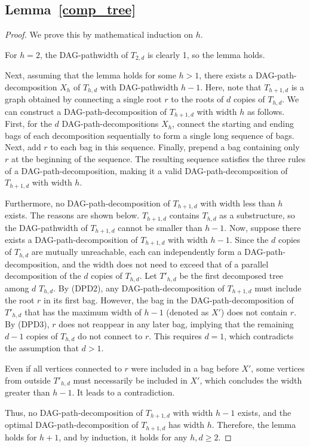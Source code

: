 \documentclass[runningheads]{llncs}
\theoremstyle{plain}
\theoremstyle{definition}
\begin{document}
\subsection{\textbf{Lemma~\ref{comp_tree}}}\label{appendix_D2}
\begin{proof}
    We prove this by mathematical induction on $h$. 
    
    For $h=2$, the DAG-pathwidth of $T_{2, d}$ is clearly 1, so the lemma holds. 
    
    Next, assuming that the lemma holds for some $h > 1$, there exists a DAG-path-decomposition $X_h$ of $T_{h, d}$ with DAG-pathwidth $h-1$. Here, note that $T_{h+1, d}$ is a graph obtained by connecting a single root $r$ to the roots of $d$ copies of $T_{h, d}$. We can construct a DAG-path-decomposition of $T_{h+1, d}$ with width $h$ as follows. First, for the $d$ DAG-path-decompositions $X_h$, connect the starting and ending bags of each decomposition sequentially to form a single long sequence of bags. Next, add $r$ to each bag in this sequence. Finally, prepend a bag containing only $r$ at the beginning of the sequence. The resulting sequence satisfies the three rules of a DAG-path-decomposition, making it a valid DAG-path-decomposition of $T_{h+1, d}$ with width $h$.
    
    Furthermore, no DAG-path-decomposition of $T_{h+1, d}$ with width less than $h$ exists. The reasons are shown below. $T_{h+1, d}$ contains $T_{h, d}$ as a substructure, so the DAG-pathwidth of $T_{h+1, d}$ cannot be smaller than $h-1$. Now, suppose there exists a DAG-path-decomposition of $T_{h+1, d}$ with width $h-1$. Since the $d$ copies of $T_{h, d}$ are mutually unreachable, each can independently form a DAG-path-decomposition, and the width does not need to exceed that of a parallel decomposition of the $d$ copies of $T_{h, d}$. Let $T'_{h, d}$ be the first decomposed tree among $d$ $T_{h, d}$. By (DPD2), any DAG-path-decomposition of $T_{h+1, d}$ must include the root $r$ in its first bag. However, the bag in the DAG-path-decomposition of $T'_{h, d}$ that has the maximum width of $h-1$ (denoted as $X'$) does not contain $r$. By (DPD3), $r$ does not reappear in any later bag, implying that the remaining $d-1$ copies of $T_{h, d}$ do not connect to $r$. This requires $d=1$, which contradicts the assumption that $d > 1$. 
    
    Even if all vertices connected to $r$ were included in a bag before $X'$, some vertices from outside $T'_{h, d}$ must necessarily be included in $X'$, which concludes the width greater than $h-1$. It leads to a contradiction.
    
    Thus, no DAG-path-decomposition of $T_{h+1, d}$ with width $h-1$ exists, and the optimal DAG-path-decomposition of $T_{h+1, d}$ has width $h$. Therefore, the lemma holds for $h+1$, and by induction, it holds for any $h, d \geq 2$.
    
\end{proof}
\end{document}

